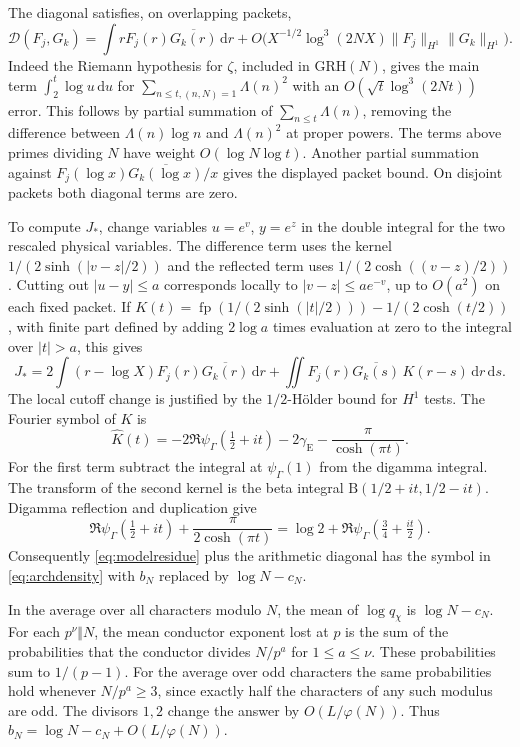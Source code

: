 \documentclass[11pt,a4paper]{article}
\numberwithin{equation}{section}
\newcommand{\grh}{\mathrm{GRH}}
\newcommand{\ud}{\mathrm d}
\begin{document}
The diagonal satisfies, on overlapping packets,
\[
 \mathcal D(F_j,G_k)
   =\int r F_j(r)\overline{G_k(r)}\,\ud r
       +O\bigl(X^{-1/2}\log^3(2NX)\|F_j\|_{H^1}\|G_k\|_{H^1}\bigr).
\]
Indeed the Riemann hypothesis for $\zeta$, included in $\grh(N)$,
gives the main term $\int_2^t\log u\,\ud u$ for
$\sum_{n\le t,(n,N)=1}\Lambda(n)^2$ with an
$O(\sqrt t\log^3(2Nt))$ error. This follows by partial summation
of $\sum_{n\le t}\Lambda(n)$, removing the difference between
$\Lambda(n)\log n$ and $\Lambda(n)^2$ at proper powers. The
terms above primes dividing $N$ have weight $O(\log N\log t)$.
Another partial summation against $F_j(\log x)\overline{G_k(\log x)}/x$
gives the displayed packet bound. On disjoint packets both diagonal
terms are zero.

To compute $J_*$, change variables $u=e^v$, $y=e^z$ in the
double integral for the two rescaled physical variables. The
difference term uses the kernel $1/(2\sinh(|v-z|/2))$ and the
reflected term uses $1/(2\cosh((v-z)/2))$.
Cutting out $|u-y|\le a$ corresponds locally to
$|v-z|\le a e^{-v}$, up to $O(a^2)$ on each fixed packet.
If
$K(t)=\operatorname{fp}(1/(2\sinh(|t|/2)))-1/(2\cosh(t/2))$,
with finite part defined by adding $2\log a$ times evaluation at
zero to the integral over $|t|>a$, this gives
\[
 J_*=2\int (r-\log X)F_j(r)\overline{G_k(r)}\,\ud r
      +\iint F_j(r)\overline{G_k(s)}\,K(r-s)\,\ud r\,\ud s .
\]
The local cutoff change is justified by the $1/2$-H\"older
bound for $H^1$ tests. The Fourier symbol of $K$ is
\[
 \widehat K(t)=-2\Re\psi_\Gamma(\tfrac12+it)
                 -2\gamma_{\mathrm E}-\frac{\pi}{\cosh(\pi t)} .
\]
For the first term subtract the integral at $\psi_\Gamma(1)$
from the digamma integral. The transform of the second kernel
is the beta integral $\mathrm B(1/2+it,1/2-it)$.
Digamma reflection and duplication \cite[Sections~5.5 and~5.9]{DLMF}
give
\[
 \Re\psi_\Gamma(\tfrac12+it)+\frac{\pi}{2\cosh(\pi t)}
   =\log 2+\Re\psi_\Gamma(\tfrac34+\tfrac{it}{2}).
\]
Consequently \cref{eq:modelresidue} plus the arithmetic diagonal
has the symbol in \cref{eq:archdensity} with $b_N$ replaced
by $\log N-c_N$.

In the average over all characters modulo $N$, the mean of
$\log q_\chi$ is $\log N-c_N$. For each $p^\nu\Vert N$,
the mean conductor exponent lost at $p$ is the sum of the
probabilities that the conductor divides $N/p^a$ for
$1\le a\le\nu$. These probabilities sum to $1/(p-1)$.
For the average over odd characters the same probabilities
hold whenever $N/p^a\ge3$, since exactly half the characters
of any such modulus are odd. The divisors $1,2$ change the
answer by $O(L/\varphi(N))$. Thus
$b_N=\log N-c_N+O(L/\varphi(N))$.
\end{document}
